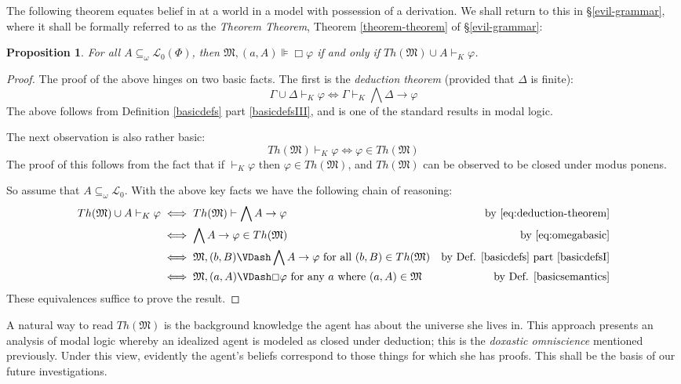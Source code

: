 \documentclass[11pt]{article}
\numberwithin{equation}{subsection}
\newtheorem{prop}[theorem]{Proposition}
\renewcommand{\Omega}{\mathfrak{M}}
\renewcommand{\phi}{\varphi}
\begin{document}
The following theorem equates belief in at a world in a model with
possession of a derivation.  We shall return to this in
\S\ref{evil-grammar}, where it shall be formally referred to as the
\emph{Theorem Theorem}, Theorem \ref{theorem-theorem} of \S\ref{evil-grammar}:
\begin{prop}\label{central-prop}
 For all $A\subseteq_\omega \mathcal{L}_0(\Phi)$, then $\Omega, (a,A) \VDash \Box \phi$ if and only if $Th(\Omega) \cup A \vdash_K \phi$.
\end{prop}
\begin{proof}
The proof of the above hinges on two basic facts.  The first is the
\emph{deduction theorem} (provided that $\Delta$ is finite):
\begin{equation}
\Gamma \cup \Delta \vdash_K \phi \iff \Gamma \vdash_K \bigwedge \Delta \to \phi \label{eq:deduction-theorem}
\end{equation}
The above follows from Definition
\ref{basicdefs} part \ref{basicdefsIII}, and is one of the standard results in
modal logic.

The next observation is also rather basic:
\begin{equation}
Th(\Omega) \vdash_K \phi \iff \phi \in Th(\Omega) \label{eq:omegabasic}
\end{equation}
The proof of this follows from the fact that if $\vdash_K \phi$ then
$\phi \in Th(\Omega)$, and $Th(\Omega)$ can be observed to be  closed under modus ponens.

So assume that $A \subseteq_\omega
\mathcal{L}_0$. With the above key facts we have the following chain
of reasoning:
\begin{align*}
  Th(\Omega) \cup A \vdash_K \phi & \iff   Th(\Omega) \vdash \bigwedge A
  \to \phi 
   & \textup{by \eqref{eq:deduction-theorem}} 
\\
 & \iff \bigwedge A \to \phi \in Th(\Omega) & \textup{by
   \eqref{eq:omegabasic}} \\
 & \iff \Omega, (b,B) \VDash \bigwedge A \to \phi \textup{ for all
   $(b,B) \in Th(\Omega)$} & \textup{by Def. \ref{basicdefs} part
   \ref{basicdefsI}} \\
 & \iff \Omega,(a,A) \VDash \Box \phi \textup{ for any $a$ where
   $(a,A) \in \Omega$} & \textup{by Def. \ref{basicsemantics}}
\end{align*}
These equivalences suffice to prove the result.
\end{proof}

A natural way to read $Th(\Omega)$ is the background knowledge the agent has about the universe she lives in.  This approach presents an analysis of modal logic whereby an idealized agent is modeled as closed under deduction; this is the \emph{doxastic omniscience} mentioned previously. Under this view, evidently the agent's beliefs correspond to those things for which she has proofs.  This shall be the basis of our future investigations.
\end{document}
